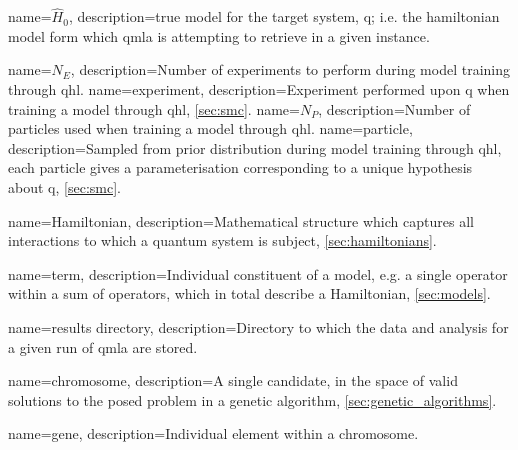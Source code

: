 {
    name=$\hat{H}_0$,
    description={\Gls{true model} for the target system, \gls{q}; 
        i.e. the \gls{hamiltonian} \gls{model} form which \acrshort{qmla} is attempting to retrieve in a given \gls{instance}.
    }
}

{
    name=$N_E$,
    description={Number of \glspl{experiment} to perform during model training through \acrshort{qhl}.}
}
{
    name=experiment,
    description={Experiment performed upon \gls{q} when training a model through \acrshort{qhl}, \cref{sec:smc}.}
}
{
    name=$N_P$,
    description={Number of \glspl{particle} used when training a \gls{model} through \acrshort{qhl}.}
}
{
    name=particle,
    description={Sampled from prior distribution during model training through \acrshort{qhl}, each particle gives a parameterisation corresponding to a unique 
    hypothesis about \gls{q}, \cref{sec:smc}.
    }
}

{
    name=Hamiltonian,
    description={Mathematical structure which captures all interactions to which a quantum system is subject, \cref{sec:hamiltonians}.}
}


{
    name=term,
    description={Individual constituent of a model, 
    e.g. a single operator within a sum of operators, which in total describe a Hamiltonian, \cref{sec:models}.
    }
}

{
    name={results directory},
    description={Directory to which the data and analysis for a given \gls{run} of \acrshort{qmla} are stored.
    }
}

{
    name=chromosome,
    description={A single candidate, in the space of valid solutions to the posed problem in a genetic algorithm, \cref{sec:genetic_algorithms}.
    }
}

{
    name=gene,
    description={Individual element within a \gls{chromosome}.
    }
}


\RestoreAcronyms
\makeglossaries
\preto\chapter{\glsresetall}
